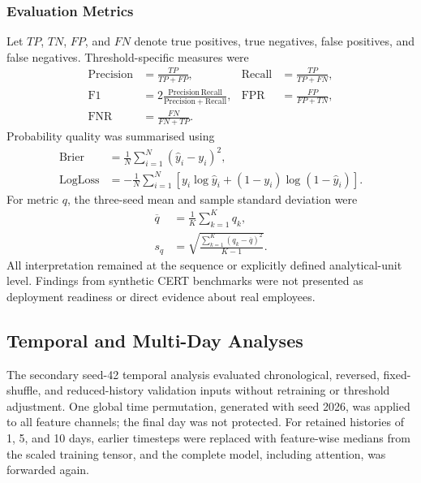 \subsubsection{Evaluation Metrics}
\label{subsubsec:evaluation_metrics}
Let \(TP\), \(TN\), \(FP\), and \(FN\) denote true positives, true
negatives, false positives, and false negatives. Threshold-specific
measures were
\begin{subequations}\label{eq:classification_metrics}
\begin{align}
\mathrm{Precision}
&=
\frac{TP}{TP+FP},
&
\mathrm{Recall}
&=
\frac{TP}{TP+FN},
\\
\mathrm{F1}
&=
2
\frac{\mathrm{Precision}\,\mathrm{Recall}}
{\mathrm{Precision}+\mathrm{Recall}},
&
\mathrm{FPR}
&=
\frac{FP}{FP+TN},
\\
\mathrm{FNR}
&=
\frac{FN}{FN+TP}.
\end{align}
\end{subequations}
Probability quality was summarised using
\begin{subequations}\label{eq:calibration_metrics}
\begin{align}
\mathrm{Brier}
&=
\frac{1}{N}
\sum_{i=1}^{N}
(\widehat y_i-y_i)^2,
\\
\mathrm{LogLoss}
&=
-\frac{1}{N}
\sum_{i=1}^{N}
\left[
y_i\log\widehat y_i
+
(1-y_i)\log(1-\widehat y_i)
\right].
\end{align}
\end{subequations}
For metric \(q\), the three-seed mean and sample standard deviation were
\begin{subequations}\label{eq:seed_summary}
\begin{align}
\overline q
&=
\frac{1}{K}\sum_{k=1}^{K}q_k,
\\
s_q
&=
\sqrt{
\frac{
\sum_{k=1}^{K}(q_k-\overline q)^2
}{
K-1
}
}.
\end{align}
\end{subequations}
All interpretation remained at the sequence or explicitly defined
analytical-unit level. Findings from synthetic CERT benchmarks were not
presented as deployment readiness or direct evidence about real employees.

\subsection{Temporal and Multi-Day Analyses}
\label{subsec:temporal_value_method}
The secondary seed-42 temporal analysis evaluated chronological, reversed,
fixed-shuffle, and reduced-history validation inputs without retraining or
threshold adjustment. One global time permutation, generated with seed
2026, was applied to all feature channels; the final day was not protected.
For retained histories of 1, 5, and 10 days, earlier timesteps were replaced
with feature-wise medians from the scaled training tensor, and the complete
model, including attention, was forwarded again.

